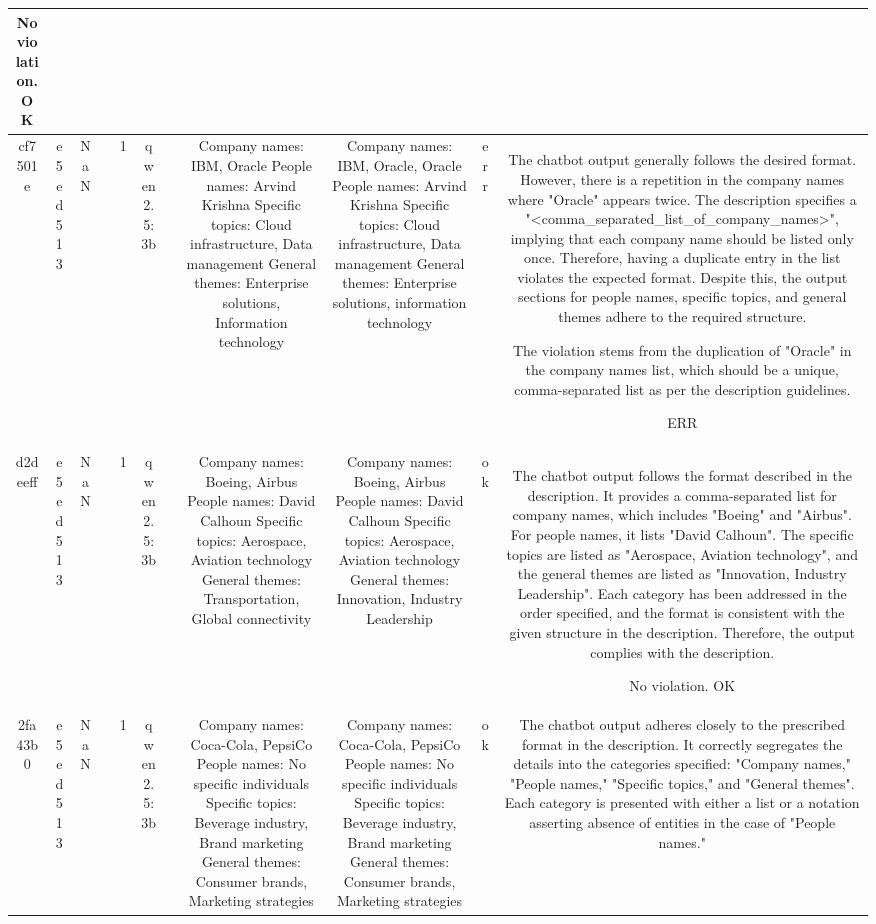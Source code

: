 \begin{table}[h!]
\begin{tabular}{|c|c|c|c|c|c|c|c|c|c|c|}
No violation.
OK\\
\hline
cf7501e & e5ed513 & NaN &  & 1 & qwen2.5:3b &  & Company names: IBM, Oracle
People names: Arvind Krishna
Specific topics: Cloud infrastructure, Data management
General themes: Enterprise solutions, Information technology & Company names: IBM, Oracle, Oracle
People names: Arvind Krishna
Specific topics: Cloud infrastructure, Data management
General themes: Enterprise solutions, information technology & err & The chatbot output generally follows the desired format. However, there is a repetition in the company names where "Oracle" appears twice. The description specifies a "<comma_separated_list_of_company_names>", implying that each company name should be listed only once. Therefore, having a duplicate entry in the list violates the expected format. Despite this, the output sections for people names, specific topics, and general themes adhere to the required structure.

The violation stems from the duplication of "Oracle" in the company names list, which should be a unique, comma-separated list as per the description guidelines.

ERR\\
\hline
d2deeff & e5ed513 & NaN &  & 1 & qwen2.5:3b &  & Company names: Boeing, Airbus
People names: David Calhoun
Specific topics: Aerospace, Aviation technology
General themes: Transportation, Global connectivity & Company names: Boeing, Airbus
People names: David Calhoun
Specific topics: Aerospace, Aviation technology
General themes: Innovation, Industry Leadership & ok & The chatbot output follows the format described in the description. It provides a comma-separated list for company names, which includes "Boeing" and "Airbus". For people names, it lists "David Calhoun". The specific topics are listed as "Aerospace, Aviation technology", and the general themes are listed as "Innovation, Industry Leadership". Each category has been addressed in the order specified, and the format is consistent with the given structure in the description. Therefore, the output complies with the description.

No violation.
OK\\
\hline
2fa43b0 & e5ed513 & NaN &  & 1 & qwen2.5:3b &  & Company names: Coca-Cola, PepsiCo
People names: No specific individuals
Specific topics: Beverage industry, Brand marketing
General themes: Consumer brands, Marketing strategies & Company names: Coca-Cola, PepsiCo
People names: No specific individuals
Specific topics: Beverage industry, Brand marketing
General themes: Consumer brands, Marketing strategies & ok & The chatbot output adheres closely to the prescribed format in the description. It correctly segregates the details into the categories specified: "Company names," "People names," "Specific topics," and "General themes". Each category is presented with either a list or a notation asserting absence of entities in the case of "People names."


\end{tabular}
\end{table}
